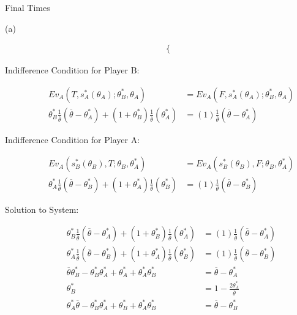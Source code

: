 \documentclass[9pt]{extarticle}
\begin{document}
\begin{problem}{Final Times}
\begin{problem}{(a)}
\begin{description}
\begin{align*}
\begin{cases}
              \end{cases}
          \end{align*}
        \item[Indifference Condition for Player B:]
          \begin{align*}
            Ev_A(T,s_{A}^{\ast}(\theta_A);\theta_B^{\ast},\theta_A) &= Ev_A(F,s_{A}^{\ast}(\theta_A);\theta_B^{\ast},\theta_A)\\
            \theta_B^{\ast}\frac{1}{ \overline{\theta} }( \overline{\theta}-\theta_A^{\ast}) + (1+\theta_B^{\ast})\frac{1}{ \overline{\theta} }(\theta_A^{\ast}) &= (1) \frac{1}{ \overline{\theta} }( \overline{\theta}-\theta_A^{\ast})
          \end{align*}
        \item[Indifference Condition for Player A:]
          \begin{align*}
            Ev_A(s_{B}^{\ast}(\theta_{B}),T;\theta_B,\theta_A^{\ast}) &= Ev_A(s_{B}^{\ast}(\theta_{B}),F;\theta_B,\theta_A^{\ast})\\
            \theta_{A}^{\ast}\frac{1}{ \overline{\theta} }( \overline{\theta}-\theta_{B}^{\ast}) + (1+\theta_A^{\ast})\frac{1}{ \overline{\theta}}(\theta_B^{\ast}) &= (1)\frac{1}{\overline{\theta}}(\overline{\theta}-\theta_B^{\ast})
          \end{align*}
        \item[Solution to System:]
          \begin{align*}
            \theta_B^{\ast}\frac{1}{ \overline{\theta} }( \overline{\theta}-\theta_A^{\ast}) + (1+\theta_B^{\ast})\frac{1}{ \overline{\theta} }(\theta_A^{\ast}) &= (1) \frac{1}{ \overline{\theta} }( \overline{\theta}-\theta_A^{\ast}) \tag*{Player A Indifference Condition}\\
            \theta_{A}^{\ast}\frac{1}{ \overline{\theta} }( \overline{\theta}-\theta_{B}^{\ast}) + (1+\theta_A^{\ast})\frac{1}{ \overline{\theta}}(\theta_B^{\ast}) &= (1)\frac{1}{\overline{\theta}}(\overline{\theta}-\theta_B^{\ast})\tag*{Player B Indifference Condition}\\
            \overline{\theta}\theta_B^{\ast} - \theta_{B}^{\ast}\theta_{A}^{\ast} + \theta_{A}^{\ast} + \theta_{A}^{\ast}\theta_{B}^{\ast} &= \overline{\theta} - \theta_{A}^{\ast}\\
            \theta_{B}^{\ast} &= 1-\frac{2\theta_{A}^{\ast}}{ \overline{\theta} }\\
            \theta_{A}^{\ast}\overline{\theta} - \theta_{B}^{\ast}\theta_{A}^{\ast} + \theta_{B}^{\ast} + \theta_{A}^{\ast}\theta_{B}^{\ast} &= \overline{\theta} - \theta_{B}^{\ast}\\

\end{align*}
\end{description}
\end{problem}
\end{problem}
\end{document}
